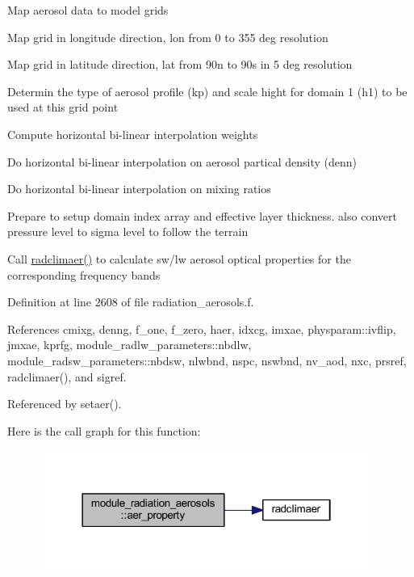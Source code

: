 \begin{DoxyEnumerate}
\item Map aerosol data to model grids
\begin{DoxyItemize}
\item Map grid in longitude direction, lon from 0 to 355 deg resolution
\item Map grid in latitude direction, lat from 90n to 90s in 5 deg resolution
\end{DoxyItemize}
\item Determin the type of aerosol profile (kp) and scale hight for domain 1 (h1) to be used at this grid point
\item Compute horizontal bi-\/linear interpolation weights
\item Do horizontal bi-\/linear interpolation on aerosol partical density (denn)
\item Do horizontal bi-\/linear interpolation on mixing ratios
\item Prepare to setup domain index array and effective layer thickness. also convert pressure level to sigma level to follow the terrain
\item Call \hyperlink{radiation__aerosols_8f_ae60b55ebc37825b2c3c95f95b23ed558}{radclimaer()} to calculate sw/lw aerosol optical properties for the corresponding frequency bands 
\end{DoxyEnumerate}

Definition at line 2608 of file radiation\+\_\+aerosols.\+f.



References cmixg, denng, f\+\_\+one, f\+\_\+zero, haer, idxcg, imxae, physparam\+::ivflip, jmxae, kprfg, module\+\_\+radlw\+\_\+parameters\+::nbdlw, module\+\_\+radsw\+\_\+parameters\+::nbdsw, nlwbnd, nspc, nswbnd, nv\+\_\+aod, nxc, prsref, radclimaer(), and sigref.



Referenced by setaer().



Here is the call graph for this function\+:\nopagebreak
\begin{figure}[H]
\begin{center}
\leavevmode
\includegraphics[width=310pt]{namespacemodule__radiation__aerosols_a0c8525abbb12f5f03e3c136c851c11bd_cgraph}
\end{center}
\end{figure}




